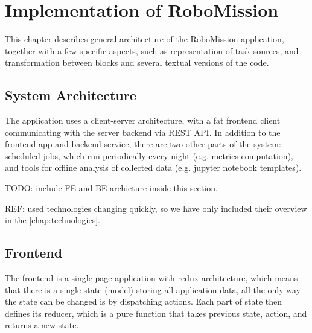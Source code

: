 \chapter{Implementation of RoboMission}
\label{chap:implementation-of-robomission}

This chapter describes general architecture of the RoboMission application,
together with a few specific aspects, such as representation of task sources,
and transformation between blocks and several textual versions of the code.

\section{System Architecture}

The application uses a client-server architecture,
with a fat frontend client communicating with the server backend via REST API.
In addition to the frontend app and backend service,
there are two other parts of the system:
scheduled jobs, which run periodically every night (e.g. metrics computation),
and tools for offline analysis of collected data
(e.g. jupyter notebook templates).

TODO: include FE and BE archicture inside this section.

REF: used technologies changing quickly, so we have only included their overview
in the \cref{chap:technologies}.


\section{Frontend}

The frontend is a single page application with redux-architecture,
which means that there is a single state (model) storing all application data,
all the only way the state can be changed is by dispatching actions.
Each part of state then defines its reducer,
which is a pure function that takes previous state, action, and returns a new state.



